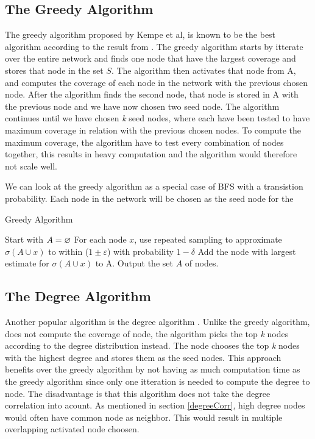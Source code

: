 \subsection{The Greedy Algorithm}
The greedy algorithm \cite{greedyInfluenc2005} \cite{Chen:2009:EIM:1557019.1557047} proposed by Kempe et al, is known to be the best algorithm according to the result from  \cite{greedyInfluenc2005}. The greedy algorithm starts by itterate over the entire network and finds one node that have the largest coverage and stores that node in the set $S$. The algorithm then activates that node from A, and computes the coverage of each node in the network with the previous chosen node. After the algorithm finds the second node, that node is stored in A with the previous node and we have now chosen two seed node. The algorithm continues until we have chosen \textit{k} seed nodes, where each have been tested to have maximum coverage in relation with the previous chosen nodes. To compute the maximum coverage, the algorithm have to test every combination of nodes together, this results in heavy computation and the algorithm would therefore not scale well.

We can look at the greedy algorithm as a special case of BFS with a transistion probability. Each node in the network will be chosen as the seed node for the

 \begin{algorithm}
\caption{Greedy Algorithm}
\begin{algorithmic}[1]
\State Start with $A = \oldemptyset$
\State For each node $x$, use repeated sampling to approximate $\sigma(A \cup {x}) $ to within ($1 \pm \varepsilon$) with probability
$1 − \delta$
\State Add the node with largest estimate for $\sigma(A \cup {x})$ to A.
\EndWhile
\State Output the set $A$ of nodes.
\end{algorithmic}
\end{algorithm}

\subsection{The Degree Algorithm}
Another popular algorithm is the degree algorithm \cite{greedyInfluenc2005}. Unlike the greedy algorithm, does not compute the coverage of node, the algorithm picks the top \textit{k} nodes according to the degree distribution instead. The node chooses the top \textit{k} nodes with the highest degree and stores them as the seed nodes. This approach benefits over the greedy algorithm by not having as much computation time as the greedy algorithm since only one itteration is needed to compute the degree to node. The disadvantage is that this algorithm does not take the degree correlation into acount. As mentioned in section \ref{degreeCorr}, high degree nodes would often have common node as neighbor. This would result in multiple overlapping activated node choosen.

